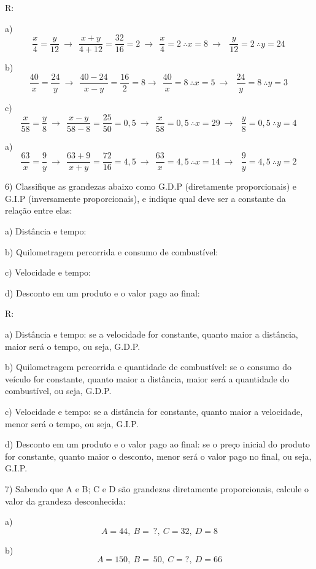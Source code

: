 R:

a)
\[\frac{x}{4} = \frac{y}{12}\  \rightarrow \ \ \frac{x + y}{4 + 12} = \frac{32}{16} = 2\  \rightarrow \ \ \frac{x}{4} = 2\ \therefore x = 8\  \rightarrow \ \ \ \frac{y}{12} = 2\ \therefore y = 24\ \]

b)
\[\frac{40}{x} = \frac{24}{y}\  \rightarrow \ \ \frac{40 - 24}{x - y} = \frac{16}{2} = 8 \rightarrow \ \ \frac{40}{x} = 8\ \therefore x = 5\  \rightarrow \ \ \ \frac{24}{y} = 8\ \therefore y = 3\ \]

c)
\[\frac{x}{58} = \frac{y}{8}\  \rightarrow \ \ \frac{x - y}{58 - 8} = \frac{25}{50} = 0,5\  \rightarrow \ \ \frac{x}{58} = 0,5\ \therefore x = 29\  \rightarrow \ \ \ \frac{y}{8} = 0,5\ \therefore y = 4\ \]

a)
\[\frac{63}{x} = \frac{9}{y}\  \rightarrow \ \ \frac{63 + 9}{x + y} = \frac{72}{16} = 4,5\  \rightarrow \ \ \frac{63}{x} = 4,5\ \therefore x = 14\  \rightarrow \ \ \ \frac{9}{y} = 4,5\ \therefore y = 2\ \]

6) Classifique as grandezas abaixo como G.D.P (diretamente
proporcionais) e G.I.P (inversamente proporcionais), e indique qual deve
ser a constante da relação entre elas:

a) Distância e tempo:

b) Quilometragem percorrida e consumo de combustível:

c) Velocidade e tempo:

d) Desconto em um produto e o valor pago ao final:

R:

a) Distância e tempo: se a velocidade for constante, quanto maior a
distância, maior será o tempo, ou seja, G.D.P.

b) Quilometragem percorrida e quantidade de combustível: se o consumo do
veículo for constante, quanto maior a distância, maior será a quantidade
do combustível, ou seja, G.D.P.

c) Velocidade e tempo: se a distância for constante, quanto maior a
velocidade, menor será o tempo, ou seja, G.I.P.

d) Desconto em um produto e o valor pago ao final: se o preço inicial do
produto for constante, quanto maior o desconto, menor será o valor pago
no final, ou seja, G.I.P.

7) Sabendo que A e B; C e D são grandezas diretamente proporcionais,
calcule o valor da grandeza desconhecida:

a) \[A = 44,\ B = \ ?,\ C = 32,\ D = 8\]

b) \[A = 150,\ B = \ 50,\ C = ?,\ D = 66\]

